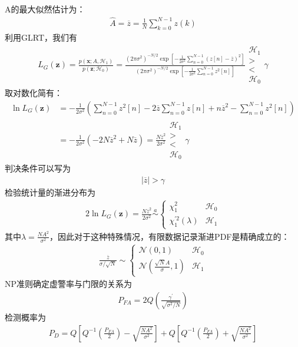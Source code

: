 \documentclass[fontset=windows]{article}
\numberwithin{figure}{section}
\begin{document}
A的最大似然估计为：
\begin{align*}
	\hat{A}=\overline{z}=\frac{1}{N}\sum_{k=0}^{N-1}z(k)
\end{align*}
利用GLRT，我们有
\begin{align*}
	L_G(\mathbf{z})
	=\frac{p(\mathbf{x};A,\mathcal{H}_1)}{p(\mathbf{z};\mathcal{H}_0)}
	=\frac{(2\pi \sigma^2)^{-N/2}\exp\left[-\frac{1}{2\sigma^2}\sum_{n=0}^{N-1}(z[n]-\overline{z})^2\right]}
	{(2\pi \sigma^2)^{-N/2}\exp\left[-\frac{1}{2\sigma^2}\sum_{n=0}^{N-1}z^2[n]\right]}
	\begin{matrix}
		\mathcal{H}_1 \\>\\<\\\mathcal{H_0}
	\end{matrix}\gamma
\end{align*}
取对数化简有：
\begin{align*}
	\ln L_G(\mathbf{z})
	 & =-\frac{1}{2\sigma^2}\left(\sum_{n=0}^{N-1}z^2[n]-
	2\overline{z}\sum_{n=0}^{N-1}z[n]+n\overline{z}^2-\sum_{n=0}^{N-1}z^2[n]\right)             \\
	 & =-\frac{1}{2\sigma^2}(-2N\overline{z}^2+N\overline{z})=\frac{N\overline{z}^2}{2\sigma^2}
	\begin{matrix}
		\mathcal{H}_1 \\>\\<\\\mathcal{H_0}
	\end{matrix}\gamma
\end{align*}
判决条件可以写为
\begin{align*}
	\vert \overline{z}\vert >\gamma
\end{align*}
检验统计量的渐进分布为
\begin{align*}
	2\ln L_G(\mathbf{z})=\frac{N\overline{z}^2}{2\sigma^2}\overset{a}{\sim}
	\left\{\begin{matrix}
		       \chi^2_1                   & \mathcal{H}_0 \\
		       \chi_1^{\prime 2}(\lambda) & \mathcal{H}_1
	       \end{matrix}
	\right.
\end{align*}
其中\(\lambda=\frac{NA^2}{\sigma^2}\)，因此对于这种特殊情况，有限数据记录渐进PDF是精确成立的：
\begin{align*}
	\frac{\overline{z}}{\sigma/\sqrt{N}}\sim
	\left\{\begin{matrix}
		       \mathcal{N}(0,1)                        & \mathcal{H}_0 \\
		       \mathcal{N}(\frac{\sqrt{N}A}{\sigma},1) & \mathcal{H}_1
	       \end{matrix}
	\right.
\end{align*}
NP准则确定虚警率与门限的关系为
\begin{align*}
	P_{FA}=2Q\left(\frac{\gamma^{\prime}}{\sqrt{\sigma^2/N}}\right)
\end{align*}
检测概率为
\begin{align*}
	P_D=Q\left[Q^{-1}\left(\frac{P_{FA}}{2}\right)-\sqrt{\frac{NA^2}{\sigma^2}}\right]+
	Q\left[Q^{-1}\left(\frac{P_{FA}}{2}\right)+\sqrt{\frac{NA^2}{\sigma^2}}\right]
\end{align*}
\end{document}
